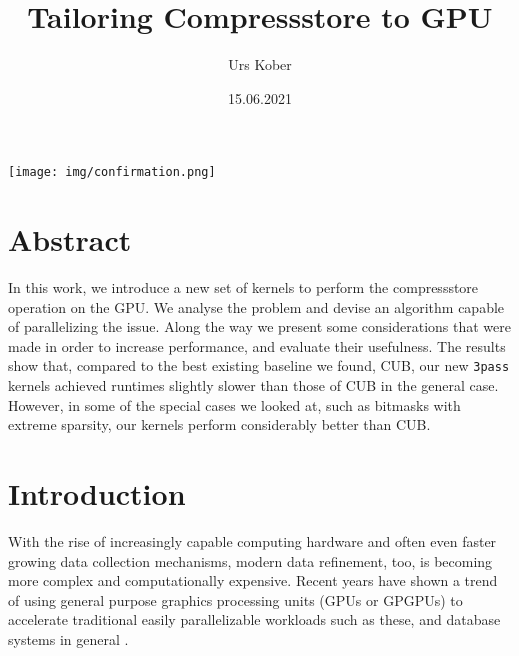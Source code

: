 \documentclass{tudscrreprt}
\begin{document}
	
	\date{15.06.2021}
	\title{Tailoring Compressstore to GPU}
	 
	\author{ Urs Kober
		\matriculationnumber{---}
		\placeofbirth{---}
	}
	\maketitle
	
	\vspace*{5cm}
	\texttt{[image: img/confirmation.png]}
	\thispagestyle{empty}
	\newpage
	
	\chapter*{Abstract}
		In this work, we introduce a new set of kernels to perform the compressstore operation on the GPU. We analyse the problem and devise an algorithm capable of parallelizing the issue. Along the way we present some considerations that were made in order to increase performance, and evaluate their usefulness. The results show that, compared to the best existing baseline we found, CUB, our new \texttt{3pass} kernels achieved runtimes slightly slower than those of CUB in the general case. However, in some of the special cases we looked at, such as bitmasks with extreme sparsity, our kernels perform considerably better than CUB.
	
	\tableofcontents
	
	\chapter{Introduction}
		With the rise of increasingly capable computing hardware and often even faster growing data collection mechanisms, modern data refinement, too, is becoming more complex and computationally expensive. Recent years have shown a trend of using general purpose graphics processing units (GPUs or GPGPUs) to accelerate traditional easily parallelizable workloads such as these, and database systems in general \cite{gpgpu_sql, gpgpu_db, gpgpu_cuda}. \\
		
\end{document}
